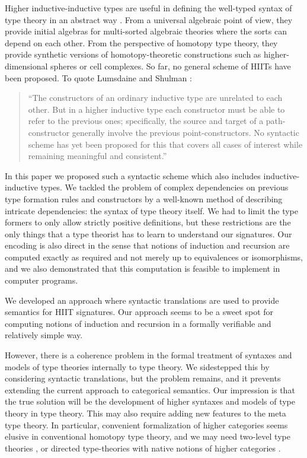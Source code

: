 \documentclass[dvipsnames]{lmcs} %
\newcommand{\1}{\mathsf{1}} \renewcommand{\Pr}{\mathsf{Pr}}
\theoremstyle{plain}\newtheorem{satz}[thm]{Satz} %
\begin{document}
Higher inductive-inductive types are useful in defining the well-typed syntax of
type theory in an abstract way \cite{ttintt}. From a universal algebraic point of
view, they provide initial algebras for multi-sorted algebraic theories where
the sorts can depend on each other. From the perspective of homotopy type
theory, they provide synthetic versions of homotopy-theoretic constructions such
as higher-dimensional spheres or cell complexes. So far, no general scheme of
HIITs have been proposed. To quote Lumsdaine and Shulman
\cite{lumsdaineShulman}:
\begin{quotation}
``The constructors of an ordinary inductive type are unrelated to each
other.  But in a higher inductive type each constructor must be able
to refer to the previous ones; specifically, the source and target of
a path-constructor generally involve the previous
point-constructors. No syntactic scheme has yet been proposed for this
that covers all cases of interest while remaining meaningful and
consistent.''
\end{quotation}
In this paper we proposed such a syntactic scheme which also includes
inductive-inductive types. We tackled the problem of complex dependencies on
previous type formation rules and constructors by a well-known method of
describing intricate dependencies: the syntax of type theory itself. We had to
limit the type formers to only allow strictly positive definitions, but these
restrictions are the only things that a type theorist has to learn to understand
our signatures. Our encoding is also direct in the sense that notions of
induction and recursion are computed exactly as required and not merely up to
equivalences or isomorphisms, and we also demonstrated that this computation is
feasible to implement in computer programs.

We developed an approach where syntactic translations are used to provide
semantics for HIIT signatures. Our approach seems to be a sweet spot for
computing notions of induction and recursion in a formally verifiable and
relatively simple way.

However, there is a coherence problem in the formal treatment of syntaxes and
models of type theories internally to type theory. We sidestepped this by
considering syntactic translations, but the problem remains, and it prevents
extending the current approach to categorical semantics. Our impression is that
the true solution will be the development of higher syntaxes and models of type
theory in type theory. This may also require adding new features to the
meta type theory. In particular, convenient formalization of higher categories
seems elusive in conventional homotopy type theory, and we may need two-level
type theories \cite{semisegal}, or directed type-theories with native
notions of higher categories \cite{nuyts2015towards, riehl2017type}.
\end{document}
